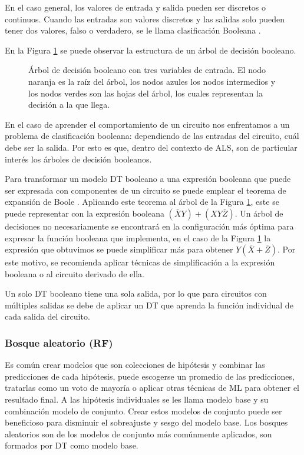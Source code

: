 En el caso general, los valores de entrada y salida pueden ser discretos o
continuos. Cuando las entradas son valores discretos y las salidas solo pueden
tener dos valores, falso o verdadero, se le llama clasificación Booleana
\cite{russell2016artificial}.

En la Figura \ref{fig:DT} se puede observar la estructura de un árbol de
decisión booleano.

\begin{figure}[htb]
  \centering
  
  \caption{Árbol de decisión booleano con tres variables de entrada. El nodo
    naranja es la raíz del árbol, los nodos azules los nodos intermedios y los
    nodos verdes son las hojas del árbol, los cuales representan la decisión a la
  que llega.}
  \label{fig:DT}
\end{figure}

En el caso de aprender el comportamiento de un circuito nos enfrentamos a un
problema de clasificación booleana: dependiendo de las entradas del circuito,
cuál debe ser la salida. Por esto es que, dentro del contexto de ALS, son de
particular interés los árboles de decisión booleanos.

Para transformar un modelo DT booleano a una expresión booleana que puede ser
expresada con componentes de un circuito se puede emplear el teorema de
expansión de Boole \cite{boole_investigation_1854}. Aplicando este teorema al
árbol de la Figura \ref{fig:DT}, este se puede representar con la expresión
booleana $(\bar{X}Y) + (XY\bar{Z})$. Un árbol de decisiones no necesariamente
se encontrará en la configuración más óptima para expresar la función booleana
que implementa, en el caso de la Figura \ref{fig:DT} la expresión que
obtuvimos se puede simplificar más para obtener $Y(\bar{X} + \bar{Z})$. Por
este motivo, se recomienda aplicar técnicas de simplificación a la expresión
booleana o al circuito derivado de ella.

Un solo DT booleano tiene una sola salida, por lo que para circuitos con
múltiples salidas se debe de aplicar un DT que aprenda la función individual de
cada salida del circuito.

\subsubsection{Bosque aleatorio (RF)}

Es común crear modelos que son colecciones de hipótesis y combinar las
predicciones de cada hipótesis, puede escogerse un promedio de las
predicciones, tratarlas como un voto de mayoría o aplicar otras técnicas de ML
para obtener el resultado final. A las hipótesis individuales se les llama
modelo base y su combinación modelo de conjunto.
Crear estos modelos de conjunto puede ser beneficioso para disminuir el
sobreajuste y sesgo del modelo base.
Los bosques aleatorios son de los modelos de conjunto más comúnmente aplicados,
son formados por DT como modelo base. \cite{russell2016artificial}

